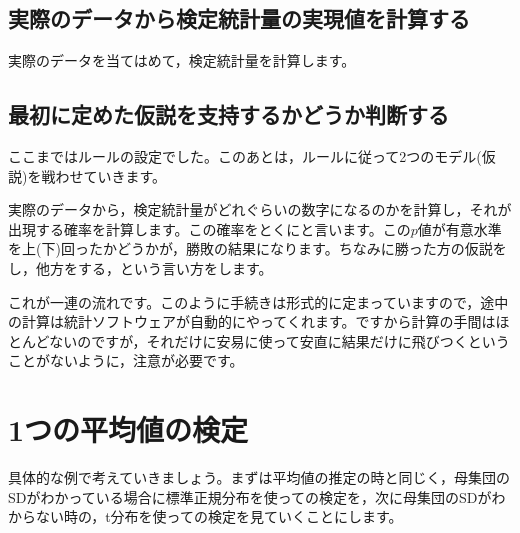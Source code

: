 \documentclass{ltjsbook}
\begin{document}
\subsection{実際のデータから検定統計量の実現値を計算する}

実際のデータを当てはめて，検定統計量を計算します。
\subsection{最初に定めた仮説を支持するかどうか判断する}
ここまではルールの設定でした。このあとは，ルールに従って2つのモデル(仮説)を戦わせていきます。

実際のデータから，検定統計量がどれぐらいの数字になるのかを計算し，それが出現する確率を計算します。この確率をとくにと言います。この$p$値が有意水準を上(下)回ったかどうかが，勝敗の結果になります。ちなみに勝った方の仮説をし，他方をする，という言い方をします。

これが一連の流れです。このように手続きは形式的に定まっていますので，途中の計算は統計ソフトウェアが自動的にやってくれます。ですから計算の手間はほとんどないのですが，それだけに安易に使って安直に結果だけに飛びつくということがないように，注意が必要です。



\section{1つの平均値の検定}
具体的な例で考えていきましょう。まずは平均値の推定の時と同じく，母集団のSDがわかっている場合に標準正規分布を使っての検定を，次に母集団のSDがわからない時の，t分布を使っての検定を見ていくことにします。
\end{document}
